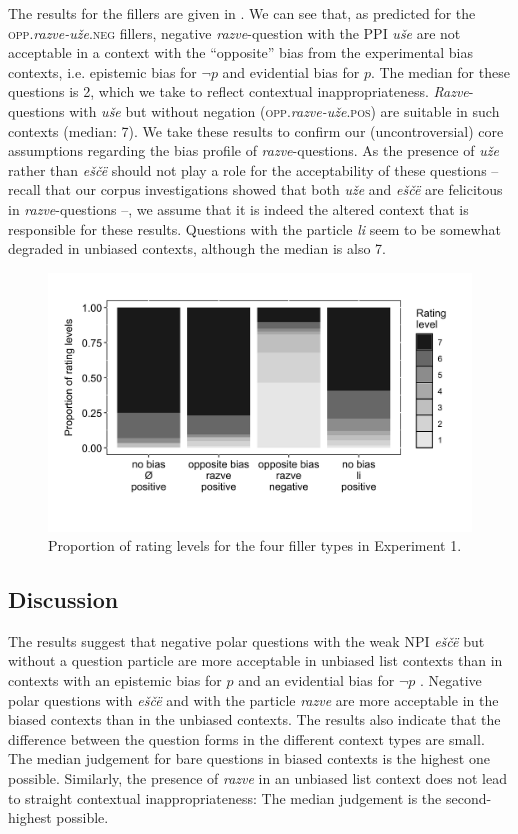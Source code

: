 \documentclass[output=paper,colorlinks,citecolor=brown]{langscibook}
\begin{document}
The results for the fillers are given in . We can see that, as predicted for the \textsc{opp.}\textit{razve-uže}\textsc{.neg} fillers, negative \textit{razve}-question with the PPI \textit{uše} are not acceptable in a context with the ``opposite'' bias from the experimental bias contexts, i.e. epistemic bias for $\neg p$ and evidential bias for $p$. The median for these questions is 2, which we take to reflect contextual inappropriateness. \textit{Razve}-questions with \textit{uše} but without negation (\textsc{opp.}\textit{razve-uže}\textsc{.pos}) are suitable in such contexts (median: 7). We take these results to confirm our (uncontroversial) core assumptions regarding the bias profile of \textit{razve}-questions. As the presence of \textit{uže} rather than \textit{eščë} should not play a role for the acceptability of these questions – recall that our corpus investigations showed that both \textit{uže} and \textit{eščë} are felicitous in \textit{razve}-questions –, we assume that it is indeed the altered context that is responsible for these results. Questions with the particle \textit{li} seem to be somewhat degraded in unbiased contexts, although the median is also 7. 

\begin{figure}
\includegraphics[height=.3\textheight]{figures/ch11-2.png}
\caption{Proportion of rating levels for the four filler types in Experiment 1.}\label{fig:2}
\end{figure}


\subsection{Discussion}\label{sec:05:4:3}

The results suggest that negative polar questions with the weak NPI \textit{eščë} but without a question particle are more acceptable in unbiased list contexts than in contexts with an epistemic bias for $p$ and an evidential bias for $\neg p$ . Negative polar questions with \textit{eščë} and with the particle \textit{razve} are more acceptable in the biased contexts than in the unbiased contexts. The results also indicate that the difference between the question forms in the different context types are small. The median judgement for bare questions in biased contexts is the highest one possible. Similarly, the presence of \textit{razve} in an unbiased list context does not lead to straight contextual inappropriateness: The median judgement is the second-highest possible.
\end{document}
